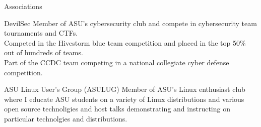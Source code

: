 \documentclass{article}
\newlength{\tabin}
\newlength{\secsep}
\newcommand{\lineunder}{\vspace*{-8pt} \\ \hspace*{-6pt} \hrulefill \\ \vspace*{-15pt}}
\newenvironment{tabbedsection}[1]{
  \begin{list}{}{
      \setlength{\itemsep}{0pt}
      \setlength{\labelsep}{0pt}
      \setlength{\labelwidth}{0pt}
      \setlength{\leftmargin}{\tabin}
      \setlength{\rightmargin}{\tabin}
      \setlength{\listparindent}{0pt}
      \setlength{\parsep}{0pt}
      \setlength{\parskip}{0pt}
      \setlength{\partopsep}{0pt}
      \setlength{\topsep}{#1}
    }
  \item[]
}{\end{list}}
\newenvironment{resume_section}[1]{
  \filbreak
  \vspace{2\secsep}
  \textsc{\large#1}
  \lineunder
  \begin{tabbedsection}{\secsep}
}{\end{tabbedsection}}
\newenvironment{resume_subsection}[2][]{
  \textbf{#2} \hfill {\normalsize #1} \hspace{-5em}
  \begin{tabbedsection}{0.5\secsep}
}{\end{tabbedsection}}
\begin{document}
\begin{resume_section}{Associations}
  	\begin{resume_subsection}{DevilSec}
		Member of ASU's cybersecurity club and compete in cybersecurity team tournaments and CTFs.\\ 
        Competed in the Hivestorm blue team competition and placed in the top 50\% out of hundreds of teams.\\
        Part of the CCDC team competing in a national collegiate cyber defense competition.
  	\end{resume_subsection}
  	\vspace{2\secsep}
  	\begin{resume_subsection}{ASU Linux User's Group (ASULUG)}
  	Member of ASU's Linux enthusiast club where I educate ASU students on a variety of Linux distributions and various open source technoligies and host talks demonstrating and instructing on particular technolgies and distributions. 
  	\end{resume_subsection}
\end{resume_section}
\end{document}
